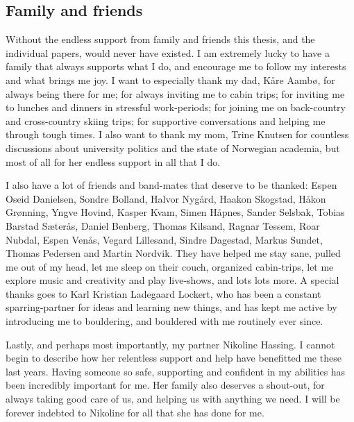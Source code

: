 \subsection*{Family and friends}

Without the endless support from family and friends this thesis, and the individual papers, would never have existed. I am extremely lucky to have a family that always supports what I do, and encourage me to follow my interests and what brings me joy. I want to especially thank my dad, Kåre Aambø, for always being there for me; for always inviting me to cabin trips; for inviting me to lunches and dinners in stressful work-periods; for joining me on back-country and cross-country skiing trips; for supportive conversations and helping me through tough times. I also want to thank my mom, Trine Knutsen for countless discussions about university politics and the state of Norwegian academia, but most of all for her endless support in all that I do. 

I also have a lot of friends and band-mates that deserve to be thanked: Espen Oseid Danielsen, Sondre Bolland, Halvor Nygård, Haakon Skogstad, Håkon Grønning, Yngve Hovind, Kasper Kvam, Simen Håpnes, Sander Selsbak, Tobias Barstad Sæterås, Daniel Benberg, Thomas Kilsand, Ragnar Tessem, Roar Nubdal, Espen Venås, Vegard Lillesand, Sindre Dagestad, Markus Sundet, Thomas Pedersen and Martin Nordvik. They have helped me stay sane, pulled me out of my head, let me sleep on their couch, organized cabin-trips, let me explore music and creativity and play live-shows, and lots lots more. A special thanks goes to Karl Kristian Ladegaard Lockert, who has been a constant sparring-partner for ideas and learning new things, and has kept me active by introducing me to bouldering, and bouldered with me routinely ever since. 

Lastly, and perhaps most importantly, my partner Nikoline Hassing. I cannot begin to describe how her relentless support and help have benefitted me these last years. Having someone so safe, supporting and confident in my abilities has been incredibly important for me. Her family also deserves a shout-out, for always taking good care of us, and helping us with anything we need. I will be forever indebted to Nikoline for all that she has done for me. 


